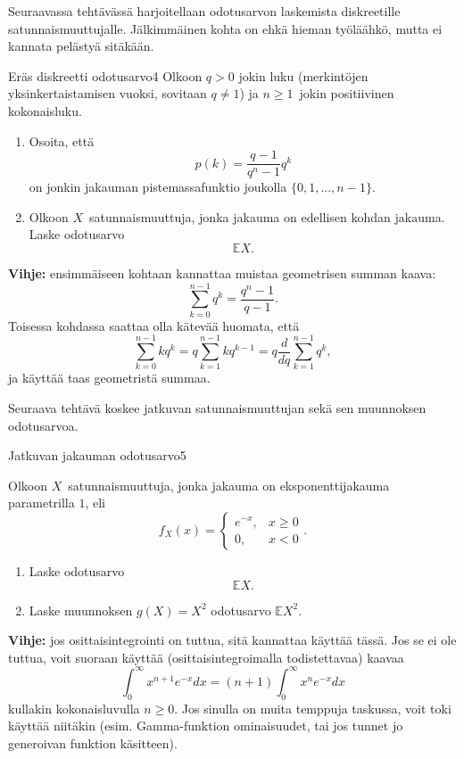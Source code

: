 \documentclass[11pt,a4paper]{amsart}
\newcommand{\E}{\mathbb{E}}
\newcommand{\1}{\mathbf{1}}
\begin{document}
Seuraavassa tehtävässä harjoitellaan odotusarvon laskemista diskreetille satunnaismuuttujalle. 
Jälkimmäinen kohta on ehkä hieman työläähkö, mutta ei kannata pelästyä sitäkään. 

\begin{Exercises}{Eräs diskreetti odotusarvo}{4}
Olkoon $q>0$ jokin luku (merkintöjen yksinkertaistamisen vuoksi, sovitaan $q\neq 1$) ja $n\geq 1$ jokin positiivinen kokonaisluku. 
\begin{enumerate}
\item Osoita, että 
\[
p(k)=\frac{q-1}{q^n-1} q^k
\]
on jonkin jakauman pistemassafunktio joukolla $\{0,1,...,n-1\}$. 

\item Olkoon $X$ satunnaismuuttuja, jonka jakauma on edellisen kohdan jakauma. Laske odotusarvo
\[
\E X.
\]

\end{enumerate}

{\bf Vihje:} ensimmäiseen kohtaan kannattaa muistaa geometrisen summan kaava:
\[
\sum_{k=0}^{n-1}q^k =\frac{q^n-1}{q-1}.
\]
Toisessa kohdassa saattaa olla kätevää huomata, että 
\[
\sum_{k=0}^{n-1}k q^k=q \sum_{k=1}^{n-1}k q^{k-1}=q \frac{d}{dq}\sum_{k=1}^{n-1}q^k, 
\]
ja käyttää taas geometristä summaa.
\end{Exercises}

Seuraava tehtävä koskee jatkuvan satunnaismuuttujan sekä sen muunnoksen odotusarvoa.

\begin{Exercises}{Jatkuvan jakauman odotusarvo}{5}

Olkoon $X$ satunnaismuuttuja, jonka jakauma on eksponenttijakauma parametrilla $1$, eli 
\[
f_X(x)=\begin{cases}
e^{- x}, & x\geq 0\\
0, & x<0
\end{cases}.
\]

\begin{enumerate}
\item Laske odotusarvo 
\[
\E X.
\]

\item Laske muunnoksen $g(X)=X^2$ odotusarvo $\E X^2$.

\end{enumerate}

{\bf Vihje:} jos osittaisintegrointi on tuttua, sitä kannattaa käyttää tässä. Jos se ei ole tuttua, voit suoraan käyttää (osittaisintegroimalla todistettavaa) kaavaa 
\[
\int_0^\infty x^{n+1} e^{-x}dx=(n+1)\int_0^\infty x^n e^{-x}dx
\]
kullakin kokonaisluvulla $n\geq 0$.
Jos sinulla on muita temppuja taskussa, voit toki käyttää niitäkin (esim. Gamma-funktion ominaisuudet, tai jos tunnet jo generoivan funktion käsitteen).
\end{Exercises}
\end{document}
